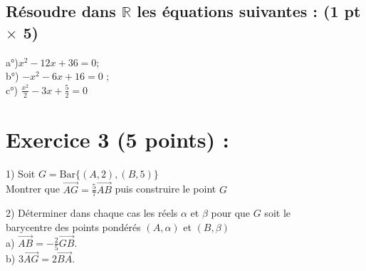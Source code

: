 \documentclass{article}
\begin{document}
\subsection*{ Résoudre dans $\mathbb{R}$ les équations suivantes : (1 pt $\times$ 5)}
a°)$x^{2}-12x+36=0$;\\ 
b°) $-x^{2}-6x+16=0$ ;\\
c°) $\frac{x^{2}}{2}-3x+\frac{5}{2}=0$\\
\section*{Exercice 3 (5 points) :}
1) Soit $G=\mathrm{Bar}\lbrace (A,2),(B,5)\rbrace$\\
Montrer que $\overrightarrow{AG}=\frac{5}{7}\overrightarrow{AB}$ puis construire le point $G$

2) Déterminer dans chaque cas les réels $\alpha$ et $\beta$ pour que $G$ soit le \\barycentre des points pondérés $(A,\alpha)$ et $(B,\beta)$\\
a) $\overrightarrow{AB}=-\frac{2}{5}\overrightarrow{GB}$.\\
b) $3\overrightarrow{AG}=2\overrightarrow{BA}$.\\
\end{document}
